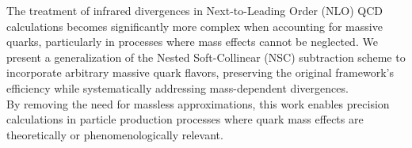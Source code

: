 
The treatment of infrared divergences in Next-to-Leading Order (NLO) QCD calculations becomes significantly more complex when accounting for massive quarks, particularly in processes where mass effects cannot be neglected. We present a generalization of the Nested Soft-Collinear (NSC) subtraction scheme to incorporate arbitrary massive quark flavors, preserving the original framework’s efficiency while systematically addressing mass-dependent divergences. \\
By removing the need for massless approximations, this work enables precision calculations in particle production processes where quark mass effects are theoretically or phenomenologically relevant.
